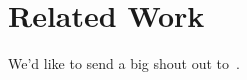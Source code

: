 \section{Related Work}
\label{sec:relwork}

We'd like to send a big shout out to~\cite{dynamo, argus, sagas, gem, ycsb}.